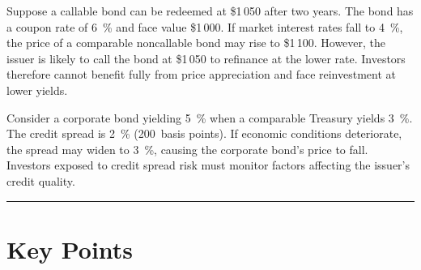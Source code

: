 \documentclass[
  letterpaper,
  DIV=11,
  numbers=noendperiod]{scrartcl}
\begin{document}
\begin{tcolorbox}[enhanced jigsaw, titlerule=0mm, rightrule=.15mm, bottomtitle=1mm, colframe=quarto-callout-note-color-frame, opacitybacktitle=0.6, coltitle=black, breakable, toprule=.15mm, title=\textcolor{quarto-callout-note-color}{\faInfo}\hspace{0.5em}{Worked Example~5~--~Evaluating call risk}, leftrule=.75mm, colbacktitle=quarto-callout-note-color!10!white, left=2mm, arc=.35mm, opacityback=0, toptitle=1mm, bottomrule=.15mm, colback=white]

Suppose a callable bond can be redeemed at \$1\,050 after two years. The
bond has a coupon rate of 6~\% and face value \$1\,000. If market
interest rates fall to 4~\%, the price of a comparable noncallable bond
may rise to \$1\,100. However, the issuer is likely to call the bond at
\$1\,050 to refinance at the lower rate. Investors therefore cannot
benefit fully from price appreciation and face reinvestment at lower
yields.

\end{tcolorbox}

\begin{tcolorbox}[enhanced jigsaw, titlerule=0mm, rightrule=.15mm, bottomtitle=1mm, colframe=quarto-callout-note-color-frame, opacitybacktitle=0.6, coltitle=black, breakable, toprule=.15mm, title=\textcolor{quarto-callout-note-color}{\faInfo}\hspace{0.5em}{Worked Example~6~--~Credit spread risk}, leftrule=.75mm, colbacktitle=quarto-callout-note-color!10!white, left=2mm, arc=.35mm, opacityback=0, toptitle=1mm, bottomrule=.15mm, colback=white]

Consider a corporate bond yielding 5~\% when a comparable Treasury
yields 3~\%. The credit spread is 2~\% (200~basis points). If economic
conditions deteriorate, the spread may widen to 3~\%, causing the
corporate bond's price to fall. Investors exposed to credit spread risk
must monitor factors affecting the issuer's credit quality.

\end{tcolorbox}

\begin{center}\rule{0.5\linewidth}{0.5pt}\end{center}

\section*{Key Points}\label{key-points}
\end{document}
